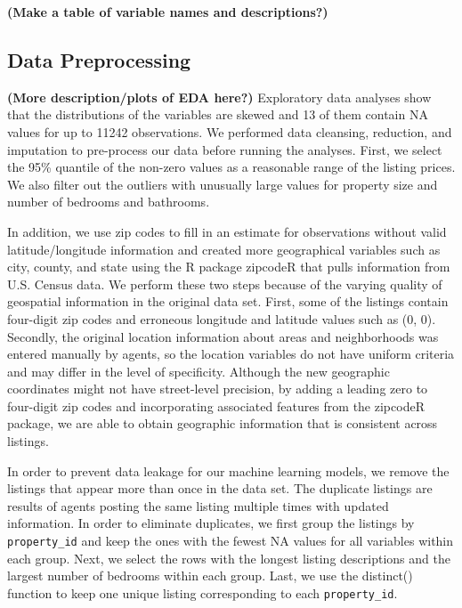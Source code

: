 \documentclass[10pt,letterpaper]{article}
\begin{document}
\textbf{(Make a table of variable names and descriptions?)}

\hypertarget{data-preprocessing}{%
\subsection{Data Preprocessing}\label{data-preprocessing}}

\textbf{(More description/plots of EDA here?)} Exploratory data analyses
show that the distributions of the variables are skewed and 13 of them
contain NA values for up to 11242 observations. We performed data
cleansing, reduction, and imputation to pre-process our data before
running the analyses. First, we select the 95\% quantile of the non-zero
values as a reasonable range of the listing prices. We also filter out
the outliers with unusually large values for property size and number of
bedrooms and bathrooms.

In addition, we use zip codes to fill in an estimate for observations
without valid latitude/longitude information and created more
geographical variables such as city, county, and state using the R
package zipcodeR that pulls information from U.S. Census data. We
perform these two steps because of the varying quality of geospatial
information in the original data set. First, some of the listings
contain four-digit zip codes and erroneous longitude and latitude values
such as (0, 0). Secondly, the original location information about areas
and neighborhoods was entered manually by agents, so the location
variables do not have uniform criteria and may differ in the level of
specificity. Although the new geographic coordinates might not have
street-level precision, by adding a leading zero to four-digit zip codes
and incorporating associated features from the zipcodeR package, we are
able to obtain geographic information that is consistent across
listings.

In order to prevent data leakage for our machine learning models, we
remove the listings that appear more than once in the data set. The
duplicate listings are results of agents posting the same listing
multiple times with updated information. In order to eliminate
duplicates, we first group the listings by \texttt{property\_id} and
keep the ones with the fewest NA values for all variables within each
group. Next, we select the rows with the longest listing descriptions
and the largest number of bedrooms within each group. Last, we use the
distinct() function to keep one unique listing corresponding to each
\texttt{property\_id}.
\end{document}
